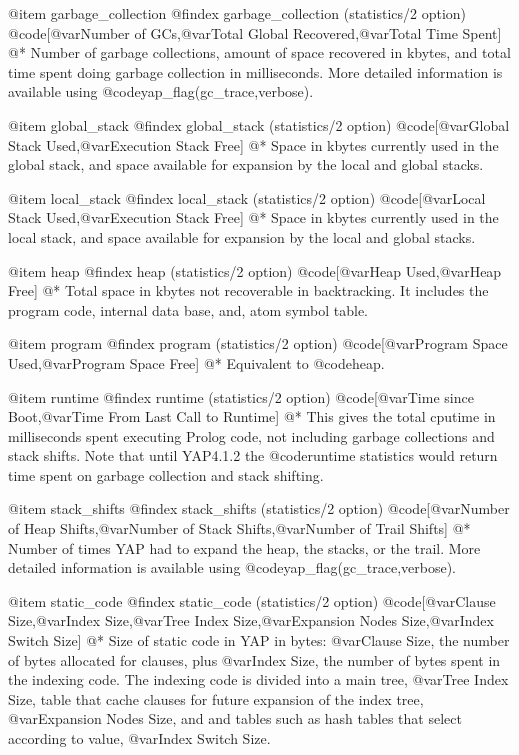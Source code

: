 {{{{{{{@item garbage_collection
@findex garbage_collection (statistics/2 option)
@code{[@var{Number of GCs},@var{Total Global Recovered},@var{Total Time
Spent}]}
@*
Number of garbage collections, amount of space recovered in kbytes, and
total time spent doing garbage collection in milliseconds. More detailed
information is available using @code{yap_flag(gc_trace,verbose)}.

@item global_stack
@findex global_stack (statistics/2 option)
@code{[@var{Global Stack Used},@var{Execution Stack Free}]}
@*
Space in kbytes currently used in the global stack, and space available for
expansion by the local and global stacks.

@item local_stack
@findex local_stack (statistics/2 option)
@code{[@var{Local Stack Used},@var{Execution Stack Free}]}
@*
Space in kbytes currently used in the local stack, and space available for
expansion by the local and global stacks.

@item heap
@findex heap (statistics/2 option)
@code{[@var{Heap Used},@var{Heap Free}]}
@*
Total space in kbytes not recoverable
in backtracking. It includes the program code, internal data base, and,
atom symbol table.

@item program
@findex program (statistics/2 option)
@code{[@var{Program Space Used},@var{Program Space Free}]}
@*
Equivalent to @code{heap}.

@item runtime
@findex runtime (statistics/2 option)
@code{[@var{Time since Boot},@var{Time From Last Call to Runtime}]}
@* 
This gives the total cputime in milliseconds spent executing Prolog
code, not including garbage collections and stack shifts. Note that
until YAP4.1.2 the @code{runtime} statistics would return time spent on
garbage collection and stack shifting.

@item stack_shifts
@findex stack_shifts (statistics/2 option)
@code{[@var{Number of Heap Shifts},@var{Number of Stack
Shifts},@var{Number of Trail Shifts}]}
@*
Number of times YAP had to
expand the heap, the stacks, or the trail. More detailed information is
available using @code{yap_flag(gc_trace,verbose)}.

@item static_code
@findex static_code (statistics/2 option)
@code{[@var{Clause Size},@var{Index Size},@var{Tree Index
Size},@var{Expansion Nodes Size},@var{Index Switch Size}]}
@*
Size of static code in YAP in bytes: @var{Clause Size}, the number of
bytes allocated for clauses, plus
@var{Index Size}, the number of bytes spent in the indexing code. The
indexing code is divided into a main tree, @var{Tree Index
Size}, table that cache clauses for future expansion of the index
tree, @var{Expansion Nodes Size}, and and 
tables such as hash tables that select according to value,  @var{Index Switch Size}.

}}}}}}}

